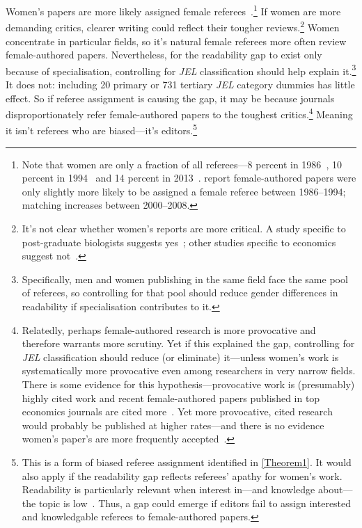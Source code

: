\begin{appendices}
\begin{refsection}
Women's papers are more likely assigned female referees~\citep{Abrevaya2012,Gilbert1994}.\footnote{Note that women are only a fraction of all referees---8 percent in 1986~\citep{Blank1991}, 10 percent in 1994~\citep{Hamermesh1994} and 14 percent in 2013~\citep{Torgler2013}.  \citet{Abrevaya2012} report female-authored papers were only slightly more likely to be assigned a female referee between 1986--1994; matching increases between 2000--2008.} If women are more demanding critics, clearer writing could reflect their tougher reviews.\footnote{It's not clear whether women's reports are more critical. A study specific to post-graduate biologists suggests yes~\citep{Borsuk2009}; other studies specific to economics suggest not~\citep{Abrevaya2012,Card2020}.} Women concentrate in particular fields, so it's natural female referees more often review female-authored papers. Nevertheless, for the readability gap to exist only because of specialisation, controlling for \emph{JEL} classification should help explain it.\footnote{Specifically, men and women publishing in the same field face the same pool of referees, so controlling for that pool should reduce gender differences in readability if specialisation contributes to it.} It does not: including 20 primary or 731 tertiary \emph{JEL} category dummies has little effect. So if referee assignment is causing the gap, it may be because journals disproportionately refer female-authored papers to the toughest critics.\footnote{Relatedly, perhaps female-authored research is more provocative and therefore warrants more scrutiny. Yet if this explained the gap, controlling for \emph{JEL} classification should reduce (or eliminate) it---unless women's work is systematically more provocative even among researchers in very narrow fields. There is some evidence for this hypothesis---provocative work is (presumably) highly cited work and recent female-authored papers published in top economics journals are cited more~\citep{Moon2020,Card2020}. Yet more provocative, cited research would probably be published at higher rates---and there is no evidence women's paper's are more frequently accepted~\citep{Ceci2014}.} Meaning it isn't referees who are biased---it's editors.\footnote{This is a form of biased referee assignment identified in \autoref{Theorem1}. It would also apply if the readability gap reflects referees' apathy for women's work. Readability is particularly relevant when interest in---and knowledge about---the topic is low~\citep{Klare1976,Fass1978}. Thus, a gap could emerge if editors fail to assign interested and knowledgable referees to female-authored papers.}


\end{refsection}
\end{appendices}

